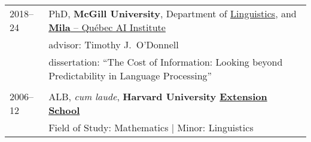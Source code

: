 \documentclass[11pt,a4paper]{article}
\begin{document}
\begin{longtable}{p{1.7cm}|p{15cm}}
  2018--24%
    &PhD,
     \textbf{McGill University},
     Department of \href{https://www.mcgill.ca/linguistics/graduate}{Linguistics}, and
     \href{https://mila.quebec}{\textbf{Mila} -- Québec AI Institute}\\
    &\quad{}advisor: Timothy J.\ O'Donnell\\
    &\quad{}dissertation:
      ``The Cost of Information:
       Looking beyond Predictability in Language Processing''\\
  \multicolumn{2}{c}{}\\
  2006--12%
      &ALB, \emph{cum laude},
     \textbf{Harvard University \href{https://extension.harvard.edu/}{Extension
     School}}\\
    &\quad{}Field of Study: Mathematics | Minor: Linguistics
  \end{longtable}
\end{document}
